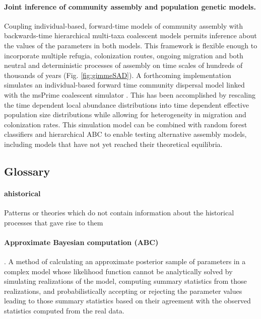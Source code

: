 \documentclass[12pt]{article}
\begin{document}
\paragraph{Joint inference of community assembly and population
  genetic models.} Coupling individual-based, forward-time models of
community assembly with backwards-time hierarchical multi-taxa
coalescent models permits inference about the values of the parameters
in both models. This framework is flexible enough to incorporate
multiple refugia, colonization routes, ongoing migration and both
neutral and deterministic processes of assembly on time scales of
hundreds of thousands of years (Fig. \ref{fig:gimmeSAD}). A
forthcoming implementation \citep[gimmeSAD$\pi$;][]{overcast}
simulates an individual-based forward time community dispersal model
\citep{rosindell2015} linked with the msPrime coalescent simulator
\citep{kelleher2016}. This has been accomplished by rescaling the time
dependent local abundance distributions into time dependent effective
population size distributions while allowing for heterogeneity in
migration and colonization rates. This simulation model can be
combined with random forest classifiers and hierarchical ABC to enable
testing alternative assembly models, including models that have not
yet reached their theoretical equilibria.


\subsection*{Glossary}

\paragraph{ahistorical} Patterns or theories which do not contain
information about the historical processes that gave rise to them

\paragraph{Approximate Bayesian computation (ABC)}. A method of
calculating an approximate posterior sample of parameters in a complex model
whose likelihood function cannot be analytically solved by simulating
realizations of the model, computing summary statistics from those
realizations, and probabilistically accepting or rejecting the
parameter values leading to those summary statistics based on their
agreement with the observed statistics computed from the real data.
\end{document}
